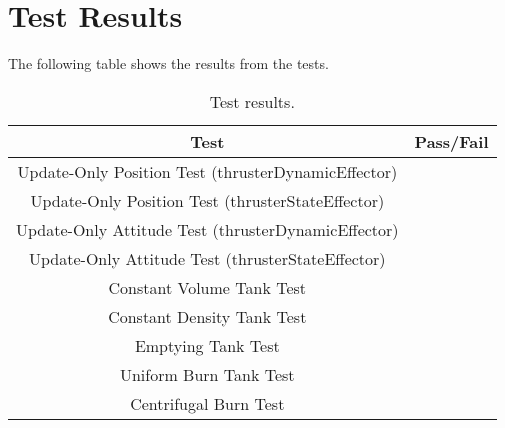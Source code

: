 \section{Test Results}

The following table shows the results from the tests.

\begin{table}[H]
	\caption{Test results.}
	\label{tab:results}
	\centering \fontsize{10}{10}\selectfont
	\begin{tabular}{c | c } %
		\hline
		\textbf{Test} 				    & \textbf{Pass/Fail}  \\ \hline
		Update-Only Position Test (thrusterDynamicEffector)  &  \\
		Update-Only Position Test (thrusterStateEffector)  &  \\
		Update-Only Attitude Test  (thrusterDynamicEffector) &    \\ 
		Update-Only Attitude Test  (thrusterStateEffector) &    \\ 
		Constant Volume Tank Test  &   \\ 
		Constant Density Tank Test &   \\ 
		Emptying Tank Test &   \\ 
		Uniform Burn Tank Test  &   \\ 
		Centrifugal Burn Test &   \\ \hline
	\end{tabular}
\end{table}